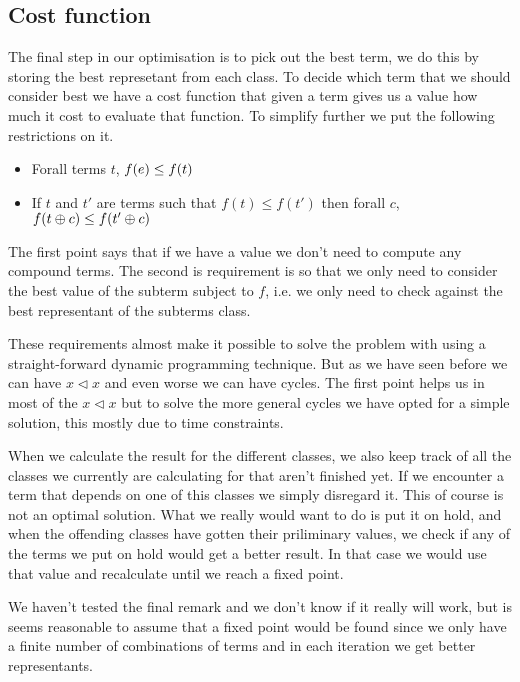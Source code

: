 \subsection{Cost function}
The final step in our optimisation is to pick out the best term, we do this by
storing the best represetant from each class. To decide which term that we should
consider best we have a cost function that given a term gives us a value how
much it cost to evaluate that function. To simplify further we put the following
restrictions on it.

\begin{itemize}
  \item Forall terms $t$, $f(e) \le f(t)$
  \item If $t$ and $t'$ are terms such that $f(t) \le f(t')$ then forall $c$,
         $f(t \oplus c) \le f(t' \oplus c)$
\end{itemize}

The first point says that if we have a value we don't need to compute any compound
terms. The second is requirement is so that we only need to consider the best value
 of the subterm subject to $f$, i.e. we only need to check against the
best representant of the subterms class.

These requirements almost make it possible to solve the problem with using a 
straight-forward dynamic programming technique. But as we have seen before we can
have $x \lhd x$ and even worse we can have cycles. The first point helps us in most
of the $x \lhd x$ but to solve the more general cycles we have opted for a simple 
solution, this mostly due to time constraints.

When we calculate the result for the different classes, we also keep track of all
the classes we currently are calculating for that aren't finished yet. If we encounter
a term that depends on one of this classes we simply disregard it. This of course
is not an optimal solution. What we really would want to do is put it on hold,
and when the offending classes have gotten their priliminary values, we check if
any of the terms we put on hold would get a better result. In that case we would use that value and recalculate until we reach a fixed point.

We haven't tested the final remark and we don't know if it really will work, but
is seems reasonable to assume that a fixed point would be found since we only have
a finite number of combinations of terms and in each iteration we get better representants.
